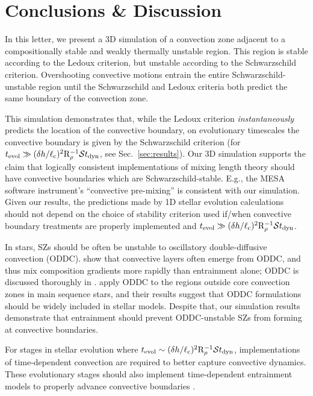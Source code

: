 \section{Conclusions \& Discussion}
\label{sec:conclusions}

In this letter, we present a 3D simulation of a convection zone adjacent to a compositionally stable and weakly thermally unstable region.
This region is stable according to the Ledoux criterion, but unstable according to the Schwarzschild criterion.
Overshooting convective motions entrain the entire Schwarzschild-unstable region until the Schwarzschild and Ledoux criteria both predict the same boundary of the convection zone.

This simulation demonstrates that, while the Ledoux criterion \emph{instantaneously} predicts the location of the convective boundary, on evolutionary timescales the convective boundary is given by the Schwarzschild criterion (for $t_{\rm{evol}} \gg (\delta h / \ell_{\rm{c}})^2\mathrm{R}_{\rho}^{-1}\mathcal{S} t_{\rm{dyn}}$, see Sec.~\ref{sec:results}).
Our 3D simulation supports the claim that logically consistent implementations of mixing length theory \citep{gabriel_etal_2014, mesa4, mesa5} should have convective boundaries which are Schwarzschild-stable.
E.g., the MESA software instrument's ``convective pre-mixing'' \citep[CPM,][]{mesa5} is consistent with our simulation.
Given our results, the predictions made by 1D stellar evolution calculations should not depend on the choice of stability criterion used if/when convective boundary treatments are properly implemented and $t_{\rm{evol}} \gg (\delta h / \ell_{\rm{c}})^2\mathrm{R}_{\rho}^{-1}\mathcal{S} t_{\rm{dyn}}$.

In stars, SZs should be often be unstable to oscillatory double-diffusive convection (ODDC).
\citet{mirouh_etal_2012} show that convective layers often emerge from ODDC, and thus mix composition gradients more rapidly than entrainment alone; ODDC is discussed thoroughly in \citet{garaud_2018}.
\citet{moore_garaud_2016} apply ODDC to the regions outside core convection zones in main sequence stars, and their results suggest that ODDC formulations should be widely included in stellar models.
Despite that, our simulation results demonstrate that entrainment should prevent ODDC-unstable SZs from forming at convective boundaries.

For stages in stellar evolution where ${t_{\rm{evol}} \sim (\delta h / \ell_{\rm{c}})^2\mathrm{R}_{\rho}^{-1}\mathcal{S} t_{\rm{dyn}}}$, implementations of time-dependent convection \citep[TDC,][]{tdc_1986} are required to better capture convective dynamics.
These evolutionary stages should also implement time-dependent entrainment models to properly advance convective boundaries \citep[e.g.,][]{turner_1968, fuentes_cumming_2020}.

